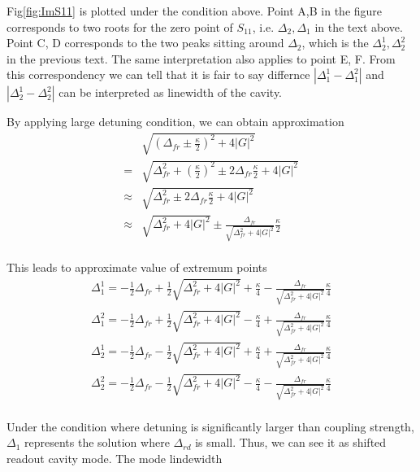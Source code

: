 Fig\ref{fig:ImS11} is plotted under the condition above. Point A,B in the figure corresponds to two roots for the zero point of $S_{11}$, i.e. $\Delta_2, \Delta_1$ in the text above. Point C, D corresponds to the two peaks sitting around $\Delta_2$, which is the $\Delta_2^1, \Delta_2^2$ in the previous text. The same interpretation also applies to point E, F. From this correspondency we can tell that it is fair to say differnce $|\Delta_1^1 - \Delta_1^2|$ and $|\Delta_2^1 - \Delta_2^2|$ can be interpreted as linewidth of the cavity.

By applying large detuning condition, we can obtain approximation
\\
\begin{equation} \begin{split}
	& \sqrt{\left( \Delta_{fr} \pm \frac{\kappa}{2}\right)^2 + 4 |G| ^ 2} \\
	= & \sqrt{ \Delta_{fr}^2 + \left(\frac{\kappa}{2}\right)^2 \pm 2 \Delta_{fr} \frac{\kappa}{2} + 4 |G| ^ 2} \\
	\approx & \sqrt{ \Delta_{fr}^2 \pm 2 \Delta_{fr} \frac{\kappa}{2} + 4 |G| ^ 2} \\
	\approx & \sqrt{ \Delta_{fr}^2 + 4 |G| ^ 2} \pm \frac{\Delta_{fr}}{\sqrt{ \Delta_{fr}^2 + 4 |G| ^ 2}} \frac{\kappa}{2}
\end{split} \end{equation}
\\
This leads to approximate value of extremum points
\begin{equation} \begin{split}
	\Delta_1^1 = -\frac{1}{2} \Delta_{fr} + \frac{1}{2}\sqrt{\Delta_{fr}^2 + 4|G|^2}  + \frac{\kappa}{4} - \frac{\Delta_{fr}}{\sqrt{ \Delta_{fr}^2 + 4 |G| ^ 2}} \frac{\kappa}{4} \\
	\Delta_1^2 = -\frac{1}{2} \Delta_{fr} + \frac{1}{2}\sqrt{\Delta_{fr}^2 + 4|G|^2}  - \frac{\kappa}{4} + \frac{\Delta_{fr}}{\sqrt{ \Delta_{fr}^2 + 4 |G| ^ 2}} \frac{\kappa}{4} \\
	\Delta_2^1 = -\frac{1}{2} \Delta_{fr} - \frac{1}{2}\sqrt{\Delta_{fr}^2 + 4|G|^2}  + \frac{\kappa}{4} + \frac{\Delta_{fr}}{\sqrt{ \Delta_{fr}^2 + 4 |G| ^ 2}} \frac{\kappa}{4} \\
	\Delta_2^2 = -\frac{1}{2} \Delta_{fr} - \frac{1}{2}\sqrt{\Delta_{fr}^2 + 4|G|^2}  - \frac{\kappa}{4} - \frac{\Delta_{fr}}{\sqrt{ \Delta_{fr}^2 + 4 |G| ^ 2}} \frac{\kappa}{4}
\end{split} \end{equation}
\\
Under the condition where detuning is significantly larger than coupling strength, $\Delta_1$ represents the solution where $\Delta_{rd}$ is small. Thus, we can see it as shifted readout cavity mode. The mode lindewidth
